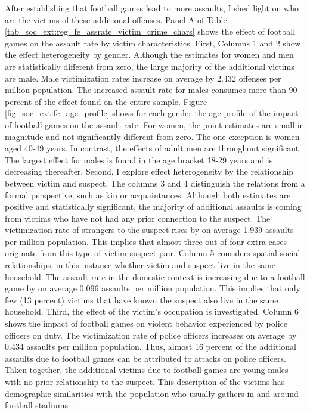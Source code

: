 

After establishing that football games lead to more assaults, I shed light on who are the victims of these additional offenses. Panel A of Table \ref{tab_soc_ext:reg_fe_assrate_victim_crime_chars} shows the effect of football games on the assault rate by victim characteristics. First, Columns 1 and 2 show the effect heterogeneity by gender. Although the estimates for women and men are statistically different from zero, the large majority of the additional victims are male. Male victimization rates increase on average by 2.432 offenses per million population. The increased assault rate for males consumes more than 90 percent of the effect found on the entire sample. Figure \ref{fig_soc_ext:fe_age_profile} shows for each gender the age profile of the impact of football games on the assault rate. For women, the point estimates are small in magnitude and not significantly different from zero. The one exception is women aged 40-49 years. In contrast, the effects of adult men are throughout significant. The largest effect for males is found in the age bracket 18-29 years and is decreasing thereafter. Second, I explore effect heterogeneity by the relationship between victim and suspect. The columns 3 and 4 distinguish the relations from a formal perspective, such as kin or acquaintances. Although both estimates are positive and statistically significant, the majority of additional assaults is coming from victims who have not had any prior connection to the suspect. The victimization rate of strangers to the suspect rises by on average 1.939 assaults per million population. This implies that almost three out of four extra cases originate from this type of victim-suspect pair. Column 5 considers spatial-social relationships, in this instance whether victim and suspect live in the same household. The assault rate in the domestic context is increasing due to a football game by on average 0.096 assaults per million population. This implies that only few (13 percent) victims that have known the suspect also live in the same household. Third, the effect of the victim's occupation is investigated. Column 6 shows the impact of football games on violent behavior experienced by police officers on duty. The victimization rate of police officers increases on average by 0.434 assaults per million population. Thus, almost 16 percent of the additional assaults due to football games can be attributed to attacks on police officers. Taken together, the additional victims due to football games are young males with no prior relationship to the suspect. This description of the victims has demographic similarities with the population who usually gathers in and around football stadiums \citep{pwc2016}.

